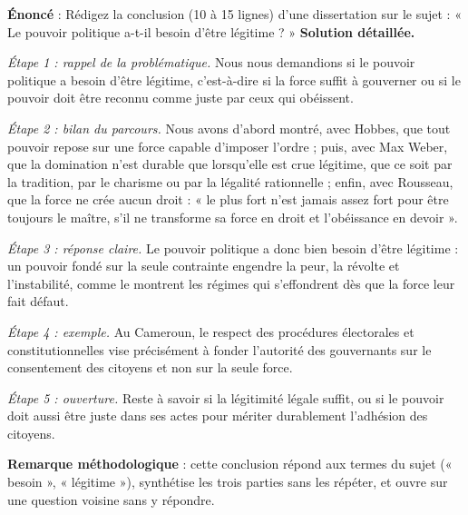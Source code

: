 \documentclass[11pt]{article}
\begin{document}
\begin{exoresolu}
\textbf{Énoncé} : Rédigez la conclusion (10 à 15 lignes) d'une dissertation sur le sujet : « Le pouvoir politique a-t-il besoin d'être légitime ? »
\tcblower
\textbf{Solution détaillée.}

\textit{Étape 1 : rappel de la problématique.} Nous nous demandions si le pouvoir politique a besoin d'être légitime, c'est-à-dire si la force suffit à gouverner ou si le pouvoir doit être reconnu comme juste par ceux qui obéissent.

\textit{Étape 2 : bilan du parcours.} Nous avons d'abord montré, avec Hobbes, que tout pouvoir repose sur une force capable d'imposer l'ordre ; puis, avec Max Weber, que la domination n'est durable que lorsqu'elle est crue légitime, que ce soit par la tradition, par le charisme ou par la légalité rationnelle ; enfin, avec Rousseau, que la force ne crée aucun droit : « le plus fort n'est jamais assez fort pour être toujours le maître, s'il ne transforme sa force en droit et l'obéissance en devoir ».

\textit{Étape 3 : réponse claire.} Le pouvoir politique a donc bien besoin d'être légitime : un pouvoir fondé sur la seule contrainte engendre la peur, la révolte et l'instabilité, comme le montrent les régimes qui s'effondrent dès que la force leur fait défaut.

\textit{Étape 4 : exemple.} Au Cameroun, le respect des procédures électorales et constitutionnelles vise précisément à fonder l'autorité des gouvernants sur le consentement des citoyens et non sur la seule force.

\textit{Étape 5 : ouverture.} Reste à savoir si la légitimité légale suffit, ou si le pouvoir doit aussi être juste dans ses actes pour mériter durablement l'adhésion des citoyens.

\textbf{Remarque méthodologique} : cette conclusion répond aux termes du sujet (« besoin », « légitime »), synthétise les trois parties sans les répéter, et ouvre sur une question voisine sans y répondre.
\end{exoresolu}
\end{document}
